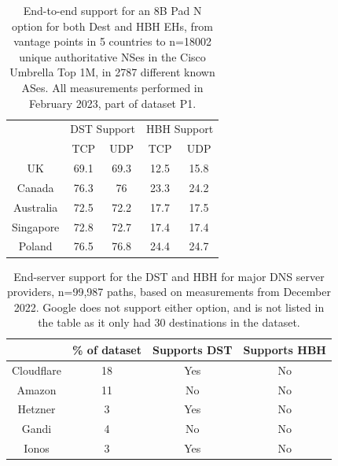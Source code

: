 \documentclass[conference]{IEEEtran}
\begin{document}
\begin{table} 
\begin{tabular}{c|cc|cc}
\multicolumn{1}{l|}{} & \multicolumn{2}{c|}{DST Support} & \multicolumn{2}{c}{HBH Support} \\ \cline{2-5} 
\multicolumn{1}{l|}{} & \multicolumn{1}{c|}{TCP}       & UDP      & \multicolumn{1}{c|}{TCP}     & UDP     \\ \hline
UK                    & \multicolumn{1}{c|}{69.1}      & 69.3    & \multicolumn{1}{c|}{12.5}    & 15.8  \\ \hline
Canada                & \multicolumn{1}{c|}{76.3}      & 76     & \multicolumn{1}{c|}{23.3}    & 24.2  \\ \hline
Australia             & \multicolumn{1}{c|}{72.5}        & 72.2      & \multicolumn{1}{c|}{17.7}    & 17.5  \\ \hline
Singapore             & \multicolumn{1}{c|}{72.8}      & 72.7    & \multicolumn{1}{c|}{17.4}    & 17.4   \\ \hline
Poland                & \multicolumn{1}{c|}{76.5}      & 76.8   & \multicolumn{1}{c|}{24.4}    & 24.7   
\end{tabular}
\label{tbl:e2e_traversal}
\caption{End-to-end support for an 8B Pad N option for both Dest and HBH EHs, from vantage points in 5 countries to n=18002 unique authoritative NSes in the Cisco Umbrella Top 1M, in 2787 different known ASes. All measurements performed in February 2023, part of dataset P1. }
\end{table}

\begin{table} 
\begin{tabular}{c|c|c|c}
           & \% of dataset & Supports DST & Supports HBH \\
\hline
Cloudflare & 18                      & Yes                & No                 \\
\hline
Amazon     & 11                     & No                 & No                 \\
\hline
Hetzner    & 3                     & Yes                & No                 \\
\hline
Gandi      & 4                     & No                 & No                 \\
\hline
Ionos      & 3                    & Yes                & No                
\end{tabular}
\label{tbl:provider_support}
\caption{End-server support for the DST and HBH for major DNS server providers, n=99,987 paths, based on measurements from December 2022. Google does not support either option, and is not listed in the table as it only had 30 destinations in the dataset.
}
\end{table}
\end{document}
